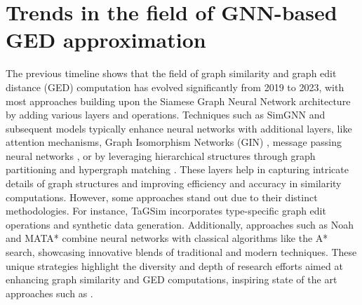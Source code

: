 \documentclass[../Thesis.tex]{subfiles}
\begin{document}
\section{Trends in the field of GNN-based GED approximation}
The previous timeline shows that the field of graph similarity and graph edit distance (GED) computation has evolved significantly from 2019 to 2023, with most approaches building upon the Siamese Graph Neural Network architecture by adding various layers and operations. Techniques such as SimGNN\cite{simgnn__a_neural_network_approach_to_fast_graph_similarity_computation} and subsequent models typically enhance neural networks with additional layers, like attention mechanisms\cite{simgnn__a_neural_network_approach_to_fast_graph_similarity_computation, noah__neural_optimized_a*_search_algorithm_for_graph_edit_distance_computation, exploring_attention_mechanism_for_graph_similarity_learning, graph_edit_distance_learning_via_different_attention, graph_graph_context_dependency_attention_for_graph_edit_distance}, Graph Isomorphism Networks (GIN) \cite{noah__neural_optimized_a*_search_algorithm_for_graph_edit_distance_computation}, message passing neural networks \cite{learning_graph_edit_distance_by_graph_neural_networks}, or by leveraging hierarchical structures through graph partitioning and hypergraph matching \cite{graph_partitioning_and_graph_neural_network_based_hierarchical_graph_matching_for_graph_similarity_computation, multilevel_graph_matching_networks_for_deep_graph_similarity_learning, h2mn__graph_similarity_learning_with_hierarchical_hypergraph_matching_networks}. These layers help in capturing intricate details of graph structures and improving efficiency and accuracy in similarity computations. However, some approaches stand out due to their distinct methodologies. For instance, TaGSim \cite{TaGSim_type_aware_graph_similarity_learning_and_computation} incorporates type-specific graph edit operations and synthetic data generation. Additionally, approaches such as Noah\cite{noah__neural_optimized_a*_search_algorithm_for_graph_edit_distance_computation} and MATA*\cite{mata_combining_learnable_node_matching_with_a*_algorithm_for_approximate_graph_edit_distance} combine neural networks with classical algorithms like the A* search, showcasing innovative blends of traditional and modern techniques. These unique strategies highlight the diversity and depth of research efforts aimed at enhancing graph similarity and GED computations, inspiring state of the art approaches such as \cite{computing_graph_edit_distance_via_neural_graph_matching}.
\end{document}
